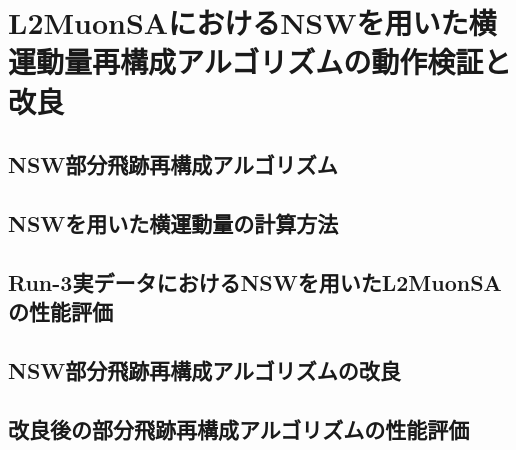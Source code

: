 \chapter{L2MuonSAにおけるNSWを用いた横運動量再構成アルゴリズムの動作検証と改良}\label{chapter4}

\section{NSW部分飛跡再構成アルゴリズム}\label{4-1}

\section{NSWを用いた横運動量の計算方法}\label{4-2}

\section{Run-3実データにおけるNSWを用いたL2MuonSAの性能評価}\label{4-3}

\section{NSW部分飛跡再構成アルゴリズムの改良}\label{4-4}

\section{改良後の部分飛跡再構成アルゴリズムの性能評価}\label{4-5}